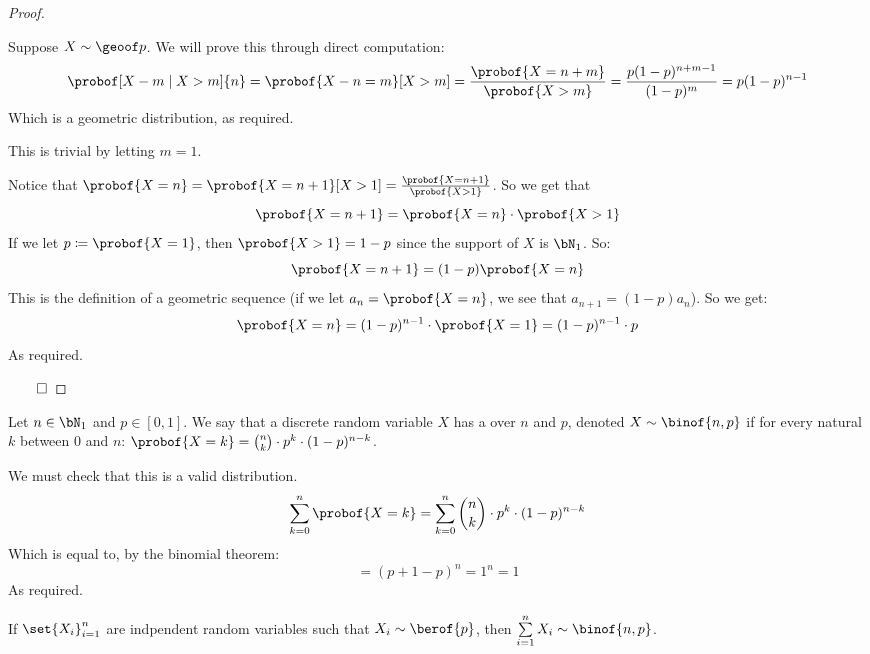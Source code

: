 \begin{proof}

	\begin{multiparitemize}[0pt]
		 Suppose $X\sim\geoof p$.
			We will prove this through direct computation:
			\[ \probof[X-m\mid X>m]{n} = \probof{X-n=m}[X>m] = \frac{\probof{X=n+m}}{\probof{X>m}} = \frac{p(1-p)^{n+m-1}}{(1-p)^m}
			= p(1-p)^{n-1} \]
			Which is a geometric distribution, as required.

		 This is trivial by letting $m=1$.

		 Notice that $\probof{X=n}=\probof{X=n+1}[X>1] = \frac{\probof{X=n+1}}{\probof{X>1}}$.
			So we get that 
			\[ \probof{X=n+1}=\probof{X=n}\cdot\probof{X>1} \]
			If we let $p\coloneqq\probof{X=1}$, then $\probof{X>1}=1-p$ since the support of $X$ is $\bN_1$.
			So:
			\[ \probof{X=n+1} = (1-p)\probof{X=n} \]
			This is the definition of a geometric sequence (if we let $a_n=\probof{X=n}$, we see that $a_{n+1}=(1-p)a_n$).
			So we get:
			\[ \probof{X=n} = (1-p)^{n-1}\cdot\probof{X=1} = (1-p)^{n-1}\cdot p \]
			As required.
	\end{multiparitemize}

	\hfill$\qed$

\end{proof}

\begin{defn*}

	Let $n\in\bN_1$ and $p\in[0,1]$.
	We say that a discrete random variable $X$ has a  over $n$ and $p$, denoted $X\sim\binof{n,p}$ if
	for every natural $k$ between $0$ and $n$:
	$\probof{X=k} = \binom{n}{k}\cdot p^k\cdot(1-p)^{n-k}$.

\end{defn*}

\begin{note}

	We must check that this is a valid distribution.
	\[ \sum_{k=0}^n\probof{X=k} = \sum_{k=0}^n\binom nk\cdot p^k\cdot (1-p)^{n-k} \]
	Which is equal to, by the binomial theorem:
	\[ = (p+1-p)^n = 1^n = 1 \]
	As required.

\end{note}

\begin{thrm*}

	If $\set{X_i}_{i=1}^n$ are indpendent random variables such that $X_i\sim\berof{p}$, then $\sum\limits_{i=1}^n X_i\sim\binof{n,p}$.

\end{thrm*}

